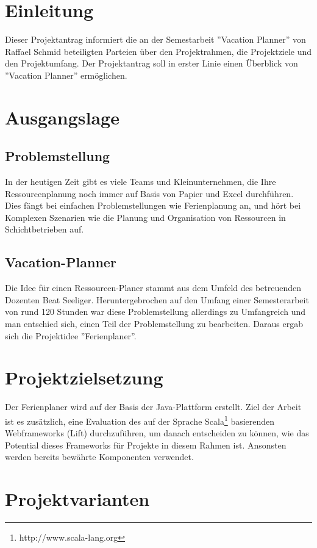 \section{Einleitung}
Dieser Projektantrag informiert die an der Semestarbeit ''Vacation Planner'' von Raffael Schmid beteiligten Parteien \"uber den Projektrahmen, die Projektziele und den Projektumfang. Der Projektantrag soll in erster Linie einen \"Uberblick von ''Vacation Planner'' erm\"oglichen.

\section{Ausgangslage}
\subsection{Problemstellung}
In der heutigen Zeit gibt es viele Teams und Kleinunternehmen, die Ihre Ressourcenplanung noch immer auf Basis von Papier und Excel durchf\"uhren. Dies f\"angt bei einfachen Problemstellungen wie Ferienplanung an, und h\"ort bei Komplexen Szenarien wie die Planung und Organisation von Ressourcen in Schichtbetrieben auf.

\subsection{Vacation-Planner}
Die Idee f\"ur einen Ressourcen-Planer stammt aus dem Umfeld des betreuenden Dozenten Beat Seeliger. Heruntergebrochen auf den Umfang einer Semesterarbeit von rund 120 Stunden war diese Problemstellung allerdings zu Umfangreich und man entschied sich, einen Teil der Problemstellung zu bearbeiten. Daraus ergab sich die Projektidee ''Ferienplaner''.

\section{Projektzielsetzung}
Der Ferienplaner wird auf der Basis der Java-Plattform erstellt. Ziel der Arbeit ist es zus\"atzlich, eine Evaluation des auf der Sprache Scala\footnote{http://www.scala-lang.org} basierenden Webframeworks (Lift) durchzuf\"uhren, um danach entscheiden zu k\"onnen,  wie das Potential dieses Frameworks f\"ur Projekte in diesem Rahmen ist. Ansonsten werden bereits bew\"ahrte Komponenten verwendet.


\section{Projektvarianten}
